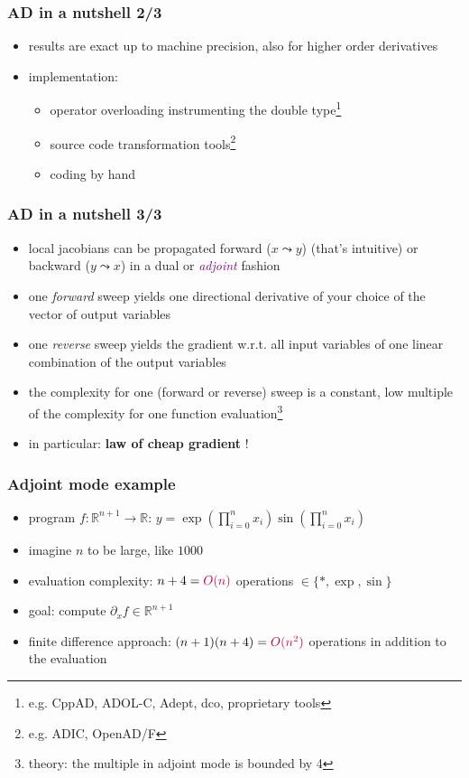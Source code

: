 \documentclass[10pt,German]{beamer}
\begin{document}
\begin{frame}[fragile]
\frametitle{AD in a nutshell 2/3}
\begin{itemize}
\item results are exact up to machine precision, also for higher order derivatives
\item implementation: \begin{itemize}
\item operator overloading instrumenting the double type\footnote{e.g. CppAD, ADOL-C, Adept, dco, proprietary tools}
\item source code transformation tools\footnote{e.g. ADIC, OpenAD/F}
\item coding by hand
\end{itemize}
\end{itemize}
\end{frame}

\begin{frame}[fragile]
\frametitle{AD in a nutshell 3/3}
\begin{itemize}
\item local jacobians can be propagated forward ($x\leadsto y$) (that's intuitive)  or backward ($y\leadsto x$) in a dual or \textcolor{purple}{\textit{adjoint}} fashion
\item one \textit{forward} sweep yields one directional derivative of your choice of the vector of output variables
\item one \textit{reverse} sweep yields the gradient w.r.t. all input variables of one linear combination of the output variables
\item the complexity for one (forward or reverse) sweep is a constant, low multiple of the complexity for one function evaluation\footnote{theory: the multiple in adjoint mode is bounded by 4}
\item in particular: \textbf{law of cheap gradient} !
\end{itemize}
\end{frame}

\begin{frame}[fragile]
\frametitle{Adjoint mode example}
\begin{itemize}
\item program $f:\mathbb{R}^{n+1}\rightarrow\mathbb{R}$: $y = \exp\left( \prod_{i=0}^n x_i \right) \sin\left( \prod_{i=0}^n x_i \right)$
\item imagine $n$ to be large, like $1000$
\item evaluation complexity: $n+4=\textcolor{purple}{O(n)}$ operations $\in \{*, \exp, \sin \}$
\item goal: compute $\partial_x f \in \mathbb{R}^{n+1}$
\item finite difference approach: $(n+1)(n+4) = \textcolor{purple}{O(n^2)}$ operations in addition to the evaluation
\end{itemize}
\end{frame}
\end{document}
